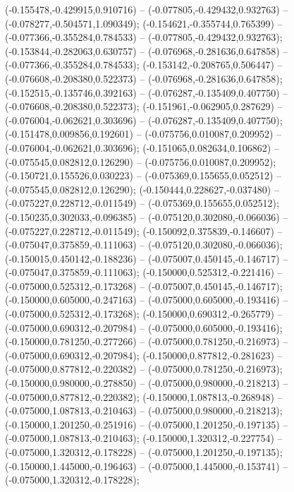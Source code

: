  (-0.155478,-0.429915,0.910716) -- (-0.077805,-0.429432,0.932763) -- (-0.078277,-0.504571,1.090349);
 (-0.154621,-0.355744,0.765399) -- (-0.077366,-0.355284,0.784533) -- (-0.077805,-0.429432,0.932763);
 (-0.153844,-0.282063,0.630757) -- (-0.076968,-0.281636,0.647858) -- (-0.077366,-0.355284,0.784533);
 (-0.153142,-0.208765,0.506447) -- (-0.076608,-0.208380,0.522373) -- (-0.076968,-0.281636,0.647858);
 (-0.152515,-0.135746,0.392163) -- (-0.076287,-0.135409,0.407750) -- (-0.076608,-0.208380,0.522373);
 (-0.151961,-0.062905,0.287629) -- (-0.076004,-0.062621,0.303696) -- (-0.076287,-0.135409,0.407750);
 (-0.151478,0.009856,0.192601) -- (-0.075756,0.010087,0.209952) -- (-0.076004,-0.062621,0.303696);
 (-0.151065,0.082634,0.106862) -- (-0.075545,0.082812,0.126290) -- (-0.075756,0.010087,0.209952);
 (-0.150721,0.155526,0.030223) -- (-0.075369,0.155655,0.052512) -- (-0.075545,0.082812,0.126290);
 (-0.150444,0.228627,-0.037480) -- (-0.075227,0.228712,-0.011549) -- (-0.075369,0.155655,0.052512);
 (-0.150235,0.302033,-0.096385) -- (-0.075120,0.302080,-0.066036) -- (-0.075227,0.228712,-0.011549);
 (-0.150092,0.375839,-0.146607) -- (-0.075047,0.375859,-0.111063) -- (-0.075120,0.302080,-0.066036);
 (-0.150015,0.450142,-0.188236) -- (-0.075007,0.450145,-0.146717) -- (-0.075047,0.375859,-0.111063);
 (-0.150000,0.525312,-0.221416) -- (-0.075000,0.525312,-0.173268) -- (-0.075007,0.450145,-0.146717);
 (-0.150000,0.605000,-0.247163) -- (-0.075000,0.605000,-0.193416) -- (-0.075000,0.525312,-0.173268);
 (-0.150000,0.690312,-0.265779) -- (-0.075000,0.690312,-0.207984) -- (-0.075000,0.605000,-0.193416);
 (-0.150000,0.781250,-0.277266) -- (-0.075000,0.781250,-0.216973) -- (-0.075000,0.690312,-0.207984);
 (-0.150000,0.877812,-0.281623) -- (-0.075000,0.877812,-0.220382) -- (-0.075000,0.781250,-0.216973);
 (-0.150000,0.980000,-0.278850) -- (-0.075000,0.980000,-0.218213) -- (-0.075000,0.877812,-0.220382);
 (-0.150000,1.087813,-0.268948) -- (-0.075000,1.087813,-0.210463) -- (-0.075000,0.980000,-0.218213);
 (-0.150000,1.201250,-0.251916) -- (-0.075000,1.201250,-0.197135) -- (-0.075000,1.087813,-0.210463);
 (-0.150000,1.320312,-0.227754) -- (-0.075000,1.320312,-0.178228) -- (-0.075000,1.201250,-0.197135);
 (-0.150000,1.445000,-0.196463) -- (-0.075000,1.445000,-0.153741) -- (-0.075000,1.320312,-0.178228);
